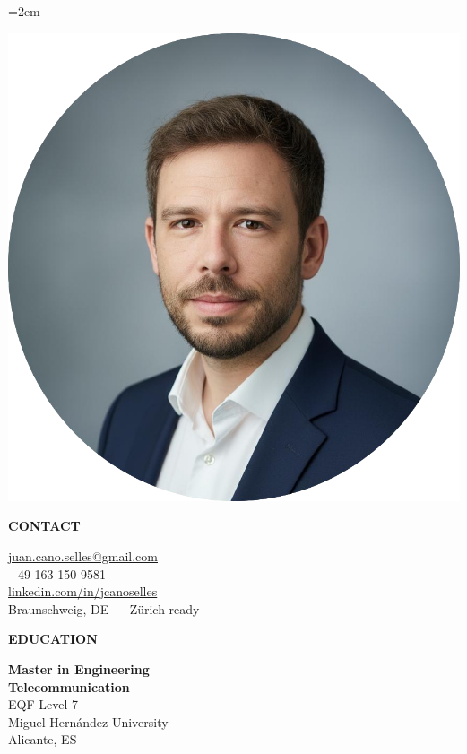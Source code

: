 \documentclass[12pt,a4paper]{article}
\newcommand{\headleft}[1]{%
  \vspace*{2ex}\textsc{\textbf{\color{softwhite}#1}}\par%
  \vspace*{-1.2ex}{\color{softwhite}\hrulefill}\par\vspace*{0.8ex}
}
\newlength{\SideBarW}
\begin{document}
\pagestyle{empty}
\sloppy
\emergencystretch=2em
\setlength{\parindent}{0pt}
\setlength{\parskip}{0pt}

\vspace*{-10mm}
\noindent\begin{minipage}[t]{\textwidth}

\colorbox{cvblue!90}{%
  \parbox[t][\textheight][t]{\SideBarW}{%
    \hspace*{4mm}%
    \begin{minipage}[t]{\dimexpr\linewidth-8mm\relax}
      \color{softwhite}
      \vspace*{6mm}
      \begin{center}
        \includegraphics[width=0.85\linewidth]{Resume_Juan_Cano.png}
      \end{center}

      \headleft{CONTACT}
      \small
      \href{mailto:juan.cano.selles@gmail.com}{juan.cano.selles@gmail.com}\\[0.6ex]
      +49 163 150 9581\\[0.6ex]
      \href{https://www.linkedin.com/in/jcanoselles}{linkedin.com/in/jcanoselles}\\[0.6ex]
      Braunschweig, DE — Zürich ready
      \normalsize

      \vspace*{3mm}

      \headleft{EDUCATION}
      \textbf{Master in Engineering}\\[0.2ex]
      \textbf{Telecommunication}\\[0.6ex]
      {\small EQF Level 7}\\[0.4ex]
      {\small Miguel Hernández University}\\[0.4ex]
      {\small Alicante, ES}


\end{minipage}}}
\end{minipage}
\end{document}
